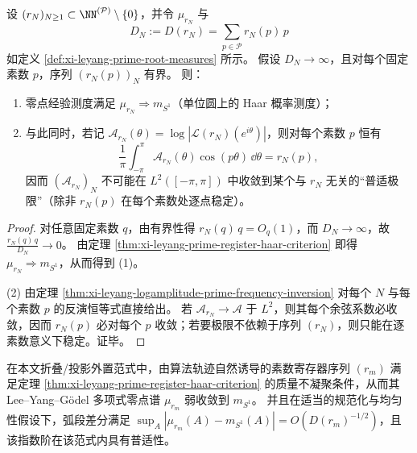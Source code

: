\begin{theorem}[零点普适律与对数振幅保持律的严格分裂]\label{thm:xi-leyang-bulk-boundary-splitting-haar-vs-logamplitude}
设 \((r_N)_{N\ge 1}\subset \NN^{(\mathcal P)}\setminus\{0\}\)，并令 \(\mu_{r_N}\) 与
\[
D_N:=D(r_N)=\sum_{p\in\mathcal P} r_N(p)\,p
\]
如定义 \ref{def:xi-leyang-prime-root-measures} 所示。
假设 \(D_N\to\infty\)，且对每个固定素数 \(p\)，序列 \((r_N(p))_{N}\) 有界。
则：
\begin{enumerate}
  \item 零点经验测度满足 \(\mu_{r_N}\Rightarrow m_{S^1}\)（单位圆上的 Haar 概率测度）；
  \item 与此同时，若记 \(\mathcal A_{r_N}(\theta)=\log|\mathcal L(r_N)(e^{i\theta})|\)，则对每个素数 \(p\) 恒有
  \[
  \frac1\pi\int_{-\pi}^{\pi}\mathcal A_{r_N}(\theta)\cos(p\theta)\,\dd\theta=r_N(p),
  \]
  因而 \((\mathcal A_{r_N})_N\) 不可能在 \(L^2([-\pi,\pi])\) 中收敛到某个与 \(r_N\) 无关的“普适极限”（除非 \(r_N(p)\) 在每个素数处逐点稳定）。
\end{enumerate}
\end{theorem}
\begin{proof}
对任意固定素数 \(q\)，由有界性得 \(r_N(q)\,q=O_q(1)\)，而 \(D_N\to\infty\)，故
\(
\frac{r_N(q)\,q}{D_N}\to 0
\)。
由定理 \ref{thm:xi-leyang-prime-register-haar-criterion} 即得 \(\mu_{r_N}\Rightarrow m_{S^1}\)，从而得到 (1)。
\par
(2) 由定理 \ref{thm:xi-leyang-logamplitude-prime-frequency-inversion} 对每个 \(N\) 与每个素数 \(p\) 的反演恒等式直接给出。
若 \(\mathcal A_{r_N}\to \mathcal A\) 于 \(L^2\)，则其每个余弦系数必收敛，因而 \(r_N(p)\) 必对每个 \(p\) 收敛；若要极限不依赖于序列 \((r_N)\)，则只能在逐素数意义下稳定。证毕。
\end{proof}

\begin{conjecture}[外置诱导素数账本的质量不凝聚与普适差分阶]\label{conj:xi-leyang-prime-register-universal-nonconcentration}
在本文折叠/投影外置范式中，由算法轨迹自然诱导的素数寄存器序列 \((r_m)\) 满足定理 \ref{thm:xi-leyang-prime-register-haar-criterion} 的质量不凝聚条件，从而其 Lee--Yang--Gödel 多项式零点谱 \(\mu_{r_m}\) 弱收敛到 \(m_{S^1}\)。
并且在适当的规范化与均匀性假设下，弧段差分满足 \(\sup_A|\mu_{r_m}(A)-m_{S^1}(A)|=O(D(r_m)^{-1/2})\)，且该指数阶在该范式内具有普适性。
\end{conjecture}



